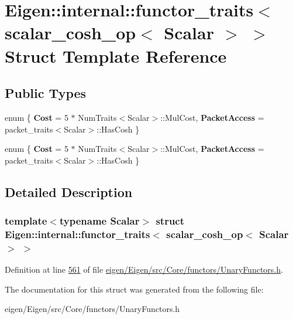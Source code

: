 \hypertarget{struct_eigen_1_1internal_1_1functor__traits_3_01scalar__cosh__op_3_01_scalar_01_4_01_4}{}\section{Eigen\+:\+:internal\+:\+:functor\+\_\+traits$<$ scalar\+\_\+cosh\+\_\+op$<$ Scalar $>$ $>$ Struct Template Reference}
\label{struct_eigen_1_1internal_1_1functor__traits_3_01scalar__cosh__op_3_01_scalar_01_4_01_4}
\subsection*{Public Types}
\begin{DoxyCompactItemize}
\item 
\mbox{\label{struct_eigen_1_1internal_1_1functor__traits_3_01scalar__cosh__op_3_01_scalar_01_4_01_4_a8b718978811893c99786a5ed415cf9a1}} 
enum \{ {\bfseries Cost} = 5 $\ast$ Num\+Traits$<$Scalar$>$\+:\+:Mul\+Cost, 
{\bfseries Packet\+Access} = packet\+\_\+traits$<$Scalar$>$\+:\+:Has\+Cosh
 \}
\item 
\mbox{\label{struct_eigen_1_1internal_1_1functor__traits_3_01scalar__cosh__op_3_01_scalar_01_4_01_4_a076ab3af8a131f900ece73b813974b35}} 
enum \{ {\bfseries Cost} = 5 $\ast$ Num\+Traits$<$Scalar$>$\+:\+:Mul\+Cost, 
{\bfseries Packet\+Access} = packet\+\_\+traits$<$Scalar$>$\+:\+:Has\+Cosh
 \}
\end{DoxyCompactItemize}


\subsection{Detailed Description}
\subsubsection*{template$<$typename Scalar$>$\newline
struct Eigen\+::internal\+::functor\+\_\+traits$<$ scalar\+\_\+cosh\+\_\+op$<$ Scalar $>$ $>$}



Definition at line \hyperlink{eigen_2_eigen_2src_2_core_2functors_2_unary_functors_8h_source_l00561}{561} of file \hyperlink{eigen_2_eigen_2src_2_core_2functors_2_unary_functors_8h_source}{eigen/\+Eigen/src/\+Core/functors/\+Unary\+Functors.\+h}.



The documentation for this struct was generated from the following file\+:\begin{DoxyCompactItemize}
\item 
eigen/\+Eigen/src/\+Core/functors/\+Unary\+Functors.\+h\end{DoxyCompactItemize}
